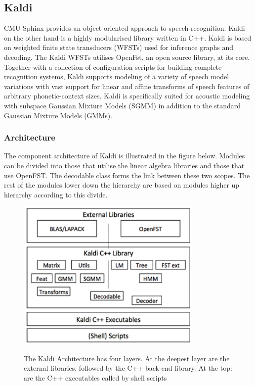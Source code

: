 \subsection{Kaldi}
CMU Sphinx provides an object-oriented approach to speech recognition. Kaldi \cite{povey2011kaldi} on the other hand is a highly modularised library written in C++. Kaldi is based on weighted finite state transducers (WFSTs) used for inference graphs and decoding. The Kaldi WFSTs utilises OpenFst, an open source library, at its core. Together with a collection of configuration scripts for building complete recognition systems, Kaldi supports modeling of a variety of speech model variations with vast support for linear and affine transforms of speech features of arbitrary phonetic-context sizes.  Kaldi is specifically suited for acoustic modeling with subspace Gaussian Mixture Models (SGMM) in addition to the standard Gaussian Mixture Models (GMMs).
\subsubsection{Architecture}
The component architecture of Kaldi is illustrated in the figure below.  Modules can be divided into those that utilise the linear algebra libraries and those that use OpenFST.  The decodable class forms the link between these two scopes.  The rest of the modules lower down the hierarchy are based on modules higher up hierarchy according to this divide.
\begin{figure}
\centering
  \includegraphics[width=9cm]{thesis/images/kaldi}\\
  \caption{ The Kaldi Architecture\citep{povey2011kaldi} has four layers.  At the deepest layer are the external libraries, followed by the C++ back-end library.  At the top: are the C++ executables called by shell scripts }\label{fig_c3_kaldi} 
\end{figure}
